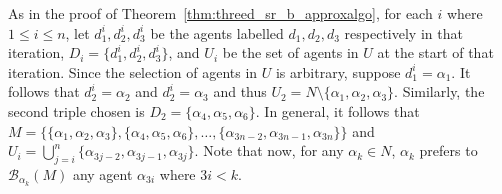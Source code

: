As in the proof of Theorem~\ref{thm:threed_sr_b_approxalgo}, for each $i$ where $1\leq i \leq n$, let $d_1^i, d_2^i, d_3^i$ be the agents labelled $d_1, d_2, d_3$ respectively in that iteration, $D_i = \{ d_1^i, d_2^i, d_3^i \}$, and $U_i$ be the set of agents in $U$ at the start of that iteration. Since the selection of agents in $U$ is arbitrary, suppose $d_1^i = \alpha_1$. It follows that $d_2^i = \alpha_2$ and $d_2^i = \alpha_3$ and thus $U_2 = N \setminus \{ \alpha_1, \alpha_2, \alpha_3 \}$. Similarly, the second triple chosen is $D_2 = \{ \alpha_4, \alpha_5, \alpha_6 \}$. In general, it follows that $M = \{ \{ \alpha_1, \alpha_2, \alpha_3 \}, \{ \alpha_4, \alpha_5, \alpha_6 \}, \dots, \{ \alpha_{3n - 2}, \alpha_{3n - 1}, \alpha_{3n} \} \}$ and $U_i = \bigcup_{j = i}^{n} \{ \alpha_{3j - 2}, \alpha_{3j - 1}, \alpha_{3j} \}$. Note that now, for any $\alpha_k \in N$, $\alpha_k$ prefers to $\mathscr{B}_{\alpha_k}(M)$ any agent $\alpha_{3i}$ where $3i < k$.

